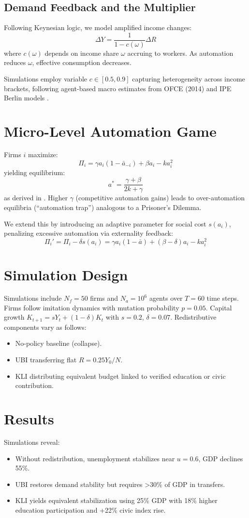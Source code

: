 \documentclass[10pt,a4paper]{article}
\begin{document}
\subsection{Demand Feedback and the Multiplier}
Following Keynesian logic, we model amplified income changes:
\[
\Delta Y = \frac{1}{1 - c(\omega)} \Delta R
\]
where \(c(\omega)\) depends on income share \( \omega \) accruing to workers. As automation reduces \( \omega \), effective consumption decreases.

Simulations employ variable \( c \in [0.5, 0.9] \) capturing heterogeneity across income brackets, following agent-based macro estimates from OFCE (2014) and IPE Berlin models \cite{OFCE2014,Prante2019}.

\section{Micro-Level Automation Game}
Firms \(i\) maximize:
\[
\Pi_i = \gamma a_i(1 - \bar{a}_{-i}) + \beta a_i - k a_i^2
\]
yielding equilibrium:
\[
a^* = \frac{\gamma + \beta}{2k + \gamma}
\]
as derived in \cite{IBM2024,Science2024}. Higher \(\gamma\) (competitive automation gains) leads to over-automation equilibria (“automation trap”) analogous to a Prisoner’s Dilemma.

We extend this by introducing an adaptive parameter for social cost \(s(a_i)\), penalizing excessive automation via externality feedback:
\[
\Pi_i' = \Pi_i - \delta s(a_i) = \gamma a_i(1-\bar{a}) + (\beta - \delta)a_i - k a_i^2
\]

\section{Simulation Design}
Simulations include \(N_f = 50\) firms and \(N_a = 10^6\) agents over \(T = 60\) time steps. Firms follow imitation dynamics with mutation probability \(p = 0.05\). Capital growth \(K_{t+1} = sY_t + (1-\delta)K_t\) with \(s=0.2\), \(\delta=0.07\). Redistributive components vary as follows:
\begin{itemize}
\item No-policy baseline (collapse).
\item UBI transferring flat \(R = 0.25Y_0/N\).
\item KLI distributing equivalent budget linked to verified education or civic contribution.
\end{itemize}

\section{Results}
Simulations reveal:
\begin{itemize}
    \item Without redistribution, unemployment stabilizes near \(u=0.6\), GDP declines 55\%.
    \item UBI restores demand stability but requires >30\% of GDP in transfers.
    \item KLI yields equivalent stabilization using 25\% GDP with 18\% higher education participation and +22\% civic index rise.
\end{itemize}
\end{document}
